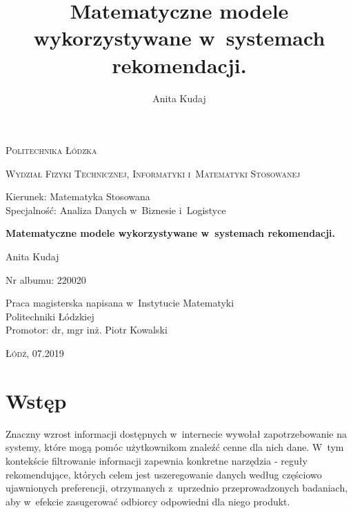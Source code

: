 \documentclass[12pt,a4paper]{report}
\author{Anita Kudaj}
\title{Matematyczne modele wykorzystywane w~systemach rekomendacji.}
\begin{document}
\begin{titlepage}
\begin{flushleft}
\end{flushleft}
\begin{center}
\textsc{{\huge Politechnika Łódzka}}
\end{center}
\bigskip
\bigskip
\begin{center}
\textsc{{\Large Wydział Fizyki Technicznej, Informatyki i~Matematyki Stosowanej}}
\end{center}
\bigskip
\bigskip
\begin{Large}
Kierunek: Matematyka Stosowana
\\Specjalność: Analiza Danych w~Biznesie i~Logistyce

\end{Large}
\bigskip
\bigskip
\noindent\hrulefill
\begin{center}
{\textbf{{\Large Matematyczne modele wykorzystywane w~systemach rekomendacji.}}}
\end{center}
\begin{flushright}
{\large 
Anita Kudaj

Nr albumu: 
220020
}
\end{flushright}
\noindent\hrulefill
\bigskip
\bigskip
\begin{center}
{\large Praca magisterska
napisana w~Instytucie Matematyki 
\\Politechniki Łódzkiej 
\bigskip
\bigskip
\\Promotor: dr, mgr inż. Piotr Kowalski
 }
\end{center}
\bigskip
\bigskip
\bigskip
\bigskip
\begin{center}
{\textsc{\large Łódź, 07.2019}}
\end{center}
\end{titlepage}


\tableofcontents


\chapter{Wstęp}
Znaczny wzrost informacji dostępnych w~internecie wywołał zapotrzebowanie na systemy, które mogą pomóc użytkownikom znaleźć cenne dla nich dane. W~tym kontekście filtrowanie informacji zapewnia konkretne narzędzia - reguły rekomendujące, których celem jest uszeregowanie danych według częściowo ujawnionych preferencji, otrzymanych z~uprzednio przeprowadzonych badaniach, aby w~efekcie zasugerować odbiorcy odpowiedni dla niego produkt. 
\end{document}
